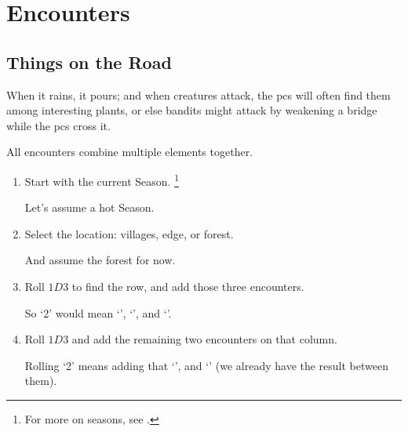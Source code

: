 \chapter[Encounters at the Crossroads]{Encounters}
\label{encounters}

\section{Things on the Road}

When it rains, it pours; and when creatures attack, the \glspl{pc} will often find them among interesting plants, or else bandits might attack by weakening a bridge while the \glspl{pc} cross it.

\begin{multicols}{2}

All encounters combine multiple elements together.

\begin{enumerate}
  \item
  Start with the current Season.%
  \footnote{For more on seasons, see .}

  \begin{exampletext}
    Let's assume a hot Season.
  \end{exampletext}
  \item
  Select the location: villages, edge, or forest.

  \begin{exampletext}
    And assume the forest for now.
  \end{exampletext}
  \item
  Roll $1D3$ to find the row, and add those three encounters.

  \begin{exampletext}
    So `2' would mean
    \setcounter{enc}{1}%
    \setcounter{track}{2}%
    `\encBigList',
    `\encBigList', and
    `\encBigList'.
  \end{exampletext}

  \item
  Roll $1D3$ and add the remaining two encounters on that column.

  \begin{exampletext}
    Rolling `2' means adding
    \setcounter{enc}{0}%
    \setcounter{track}{3}%
    that `\encBigList', and
    `\encBigList'
    (we already have the result between them).
  \end{exampletext}


\end{enumerate}
\end{multicols}
